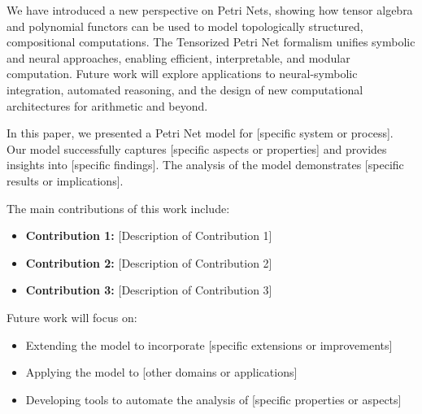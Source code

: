 \label{sec:conclusion}

We have introduced a new perspective on Petri Nets, showing how tensor algebra and polynomial functors can be used to model topologically structured, compositional computations. The Tensorized Petri Net formalism unifies symbolic and neural approaches, enabling efficient, interpretable, and modular computation. Future work will explore applications to neural-symbolic integration, automated reasoning, and the design of new computational architectures for arithmetic and beyond.


In this paper, we presented a Petri Net model for [specific system or process]. Our model successfully captures [specific aspects or properties] and provides insights into [specific findings]. The analysis of the model demonstrates [specific results or implications].

The main contributions of this work include:
\begin{itemize}[leftmargin=*]
    \item \textbf{Contribution 1:} [Description of Contribution 1]
    \item \textbf{Contribution 2:} [Description of Contribution 2]
    \item \textbf{Contribution 3:} [Description of Contribution 3]
\end{itemize}

Future work will focus on:
\begin{itemize}
    \item Extending the model to incorporate [specific extensions or improvements]
    \item Applying the model to [other domains or applications]
    \item Developing tools to automate the analysis of [specific properties or aspects]
\end{itemize}